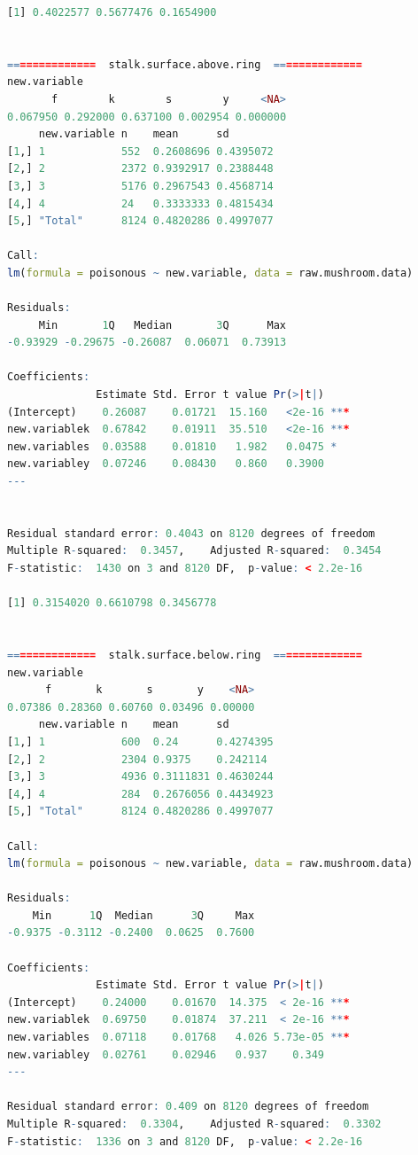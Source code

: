 \documentclass[12pt]{article}
\begin{document}
\begin{lstlisting}[language = R]
[1] 0.4022577 0.5677476 0.1654900


==============  stalk.surface.above.ring  ==============
new.variable
       f        k        s        y     <NA> 
0.067950 0.292000 0.637100 0.002954 0.000000 
     new.variable n    mean      sd       
[1,] 1            552  0.2608696 0.4395072
[2,] 2            2372 0.9392917 0.2388448
[3,] 3            5176 0.2967543 0.4568714
[4,] 4            24   0.3333333 0.4815434
[5,] "Total"      8124 0.4820286 0.4997077

Call:
lm(formula = poisonous ~ new.variable, data = raw.mushroom.data)

Residuals:
     Min       1Q   Median       3Q      Max 
-0.93929 -0.29675 -0.26087  0.06071  0.73913 

Coefficients:
              Estimate Std. Error t value Pr(>|t|)    
(Intercept)    0.26087    0.01721  15.160   <2e-16 ***
new.variablek  0.67842    0.01911  35.510   <2e-16 ***
new.variables  0.03588    0.01810   1.982   0.0475 *  
new.variabley  0.07246    0.08430   0.860   0.3900    
---


Residual standard error: 0.4043 on 8120 degrees of freedom
Multiple R-squared:  0.3457,	Adjusted R-squared:  0.3454 
F-statistic:  1430 on 3 and 8120 DF,  p-value: < 2.2e-16

[1] 0.3154020 0.6610798 0.3456778


==============  stalk.surface.below.ring  ==============
new.variable
      f       k       s       y    <NA> 
0.07386 0.28360 0.60760 0.03496 0.00000 
     new.variable n    mean      sd       
[1,] 1            600  0.24      0.4274395
[2,] 2            2304 0.9375    0.242114 
[3,] 3            4936 0.3111831 0.4630244
[4,] 4            284  0.2676056 0.4434923
[5,] "Total"      8124 0.4820286 0.4997077

Call:
lm(formula = poisonous ~ new.variable, data = raw.mushroom.data)

Residuals:
    Min      1Q  Median      3Q     Max 
-0.9375 -0.3112 -0.2400  0.0625  0.7600 

Coefficients:
              Estimate Std. Error t value Pr(>|t|)    
(Intercept)    0.24000    0.01670  14.375  < 2e-16 ***
new.variablek  0.69750    0.01874  37.211  < 2e-16 ***
new.variables  0.07118    0.01768   4.026 5.73e-05 ***
new.variabley  0.02761    0.02946   0.937    0.349    
---

Residual standard error: 0.409 on 8120 degrees of freedom
Multiple R-squared:  0.3304,	Adjusted R-squared:  0.3302 
F-statistic:  1336 on 3 and 8120 DF,  p-value: < 2.2e-16


\end{lstlisting}
\end{document}
